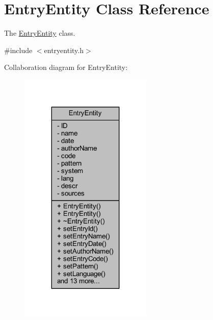 \hypertarget{class_entry_entity}{\section{Entry\+Entity Class Reference}
\label{class_entry_entity}
}


The \hyperlink{class_entry_entity}{Entry\+Entity} class.  




{\ttfamily \#include $<$entryentity.\+h$>$}



Collaboration diagram for Entry\+Entity\+:
\nopagebreak
\begin{figure}[H]
\begin{center}
\leavevmode
\includegraphics[width=179pt]{class_entry_entity__coll__graph}
\end{center}
\end{figure}
